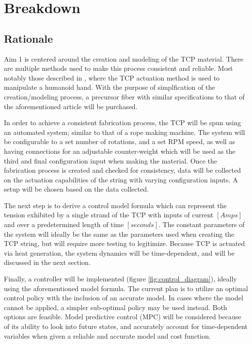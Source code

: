 \section{Breakdown}

\subsection{Rationale}

	Aim 1 is centered around the creation and modeling of the TCP material. There are multiple methods used to make this process consistent and reliable. Most notably those described in \cite{wu_compact_2017}, where the TCP actuation method is used to manipulate a humanoid hand. With the purpose of simplfication of the creation/modeling process, a precursor fiber with similar specifications to that of the aforementioned article will be purchased.

	In order to achieve a consistent fabrication process, the TCP will be spun using an automated system; similar to that of a rope making machine. The system will be configurable to a set number of rotations, and a set RPM speed, as well as having connections for an adjustable counter-weight which will be used as the third and final configuration input when making the material. Once the fabrication process is created and checked for consistency, data will be collected on the actuation capabilities of the string with varying configuration inputs. A setup will be chosen based on the data collected.

	The next step is to derive a control model formula which can represent the tension exhibited by a single strand of the TCP with inputs of current $[Amps]$ and over a predetermined length of time $[seconds]$. The constant parameters of the system will ideally be the same as the parameters used when creating the TCP string, but will require more testing to legitimize. Because TCP is actuated via heat generation, the system dynamics will be time-dependent, and will be discussed in the next section.

	Finally, a controller will be implemented (figure \ref{fig:control_diagram}), ideally using the aforementioned model formula. The current plan is to utilize an optimal control policy with the inclusion of an accurate model. In cases where the model cannot be applied, a simpler sub-optimal policy may be used instead. Both options are feasible. Model predictive control (MPC) will be considered because of its ability to look into future states, and accurately account for time-dependent variables when given a reliable and accurate model and cost function.

